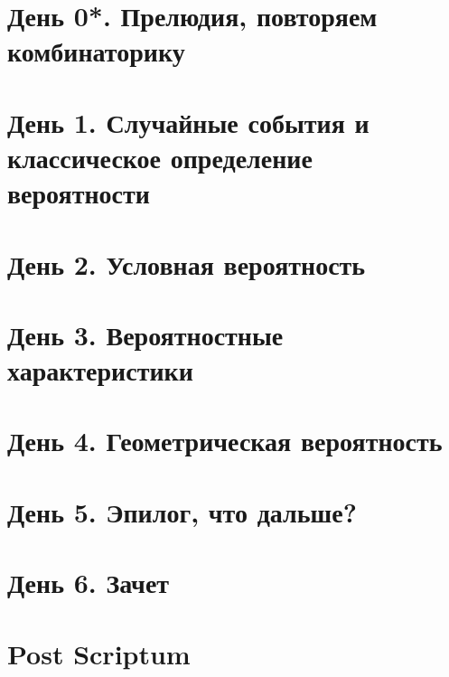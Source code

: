 \documentclass{article}
\theoremstyle{definition}
\theoremstyle{remark}
\begin{document}
\tableofcontents


\section{День 0*. Прелюдия, повторяем комбинаторику}

\section{День 1. Случайные события и классическое определение вероятности}

\section{День 2. Условная вероятность}

\section{День 3. Вероятностные характеристики}

\section{День 4. Геометрическая вероятность}

\section{День 5. Эпилог, что дальше?}

\section{День 6. Зачет}

\section*{Post Scriptum}
\end{document}
